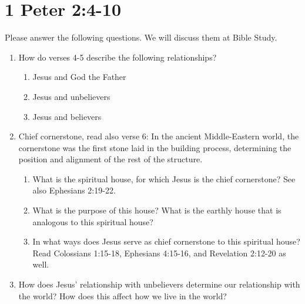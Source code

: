 \documentclass[12pt]{article}
\newcommand{\answerbox}{\vspace{1cm}}
\begin{document}
\part*{1 Peter 2:4-10}
Please answer the following questions.
We will discuss them at Bible Study.
\begin{enumerate}
\section*{The analogy (4-6)}
\item How do verses 4-5 describe the following relationships?
    \begin{enumerate}
    \item Jesus and God the Father
        \answerbox
    \item Jesus and unbelievers
        \answerbox
    \item Jesus and believers
        \answerbox
    \end{enumerate}
\item Chief cornerstone, read also verse 6: In the ancient Middle-Eastern world,
    the cornerstone was the first stone laid in the building process,
    determining the position and alignment of the rest of the structure.
    \begin{enumerate}
    \item What is the spiritual house, for which Jesus is the chief cornerstone?
        See also Ephesians 2:19-22.
        \answerbox
    \item What is the purpose of this house?
        What is the earthly house that is analogous to this spiritual house?
        \answerbox
    \item In what ways does Jesus serve as chief cornerstone 
        to this spiritual house?
        Read Colossians 1:15-18, Ephesians 4:15-16, and Revelation 2:12-20
        as well.
        \answerbox
    \end{enumerate}
\item How does Jesus' relationship with unbelievers determine
        our relationship with the world?
    How does this affect how we live in the world?
        \answerbox


\end{enumerate}
\end{document}
